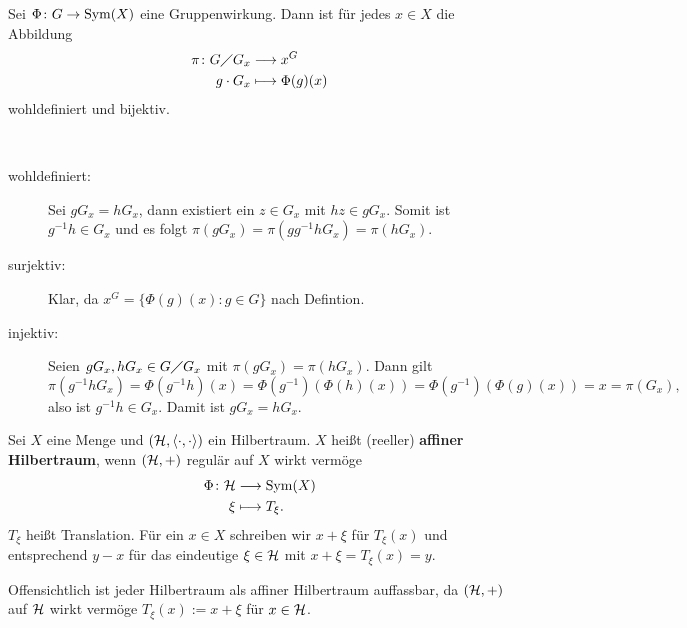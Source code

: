 \begin{lemma}[Bahnensatz]
\label{bahnensatz}
	Sei $\Phi\colon G \rightarrow \operatorname{Sym}(X)$ eine Gruppenwirkung. Dann ist für jedes $x \in X$ die Abbildung
	\begin{equation}
	\begin{aligned}
		\pi\colon G \diagup G_x &\longrightarrow x^G \\
		g\cdot G_x &\longmapsto \Phi(g)(x)
	\end{aligned}
	\end{equation}
	wohldefiniert und bijektiv.
\end{lemma}

\begin{beweis}
	\mbox{} \\[-.85cm]
	\begin{description}
		\item[wohldefiniert:] Sei $gG_x = hG_x$, dann existiert ein $z \in G_x$ mit $hz \in gG_x$. Somit ist $g^{-1}h \in G_x$ und es folgt $\pi(gG_x) = \pi(gg^{-1}hG_x) = \pi(hG_x)$.
		\item[surjektiv:] Klar, da $x^G = \{\Phi(g)(x) : g \in G\}$ nach Defintion.
		\item[injektiv:] Seien $gG_x, hG_x \in G \diagup G_x$ mit $\pi(gG_x) = \pi(hG_x)$. Dann gilt
		\[ \pi(g^{-1}hG_x) = \Phi(g^{-1}h)(x) = \Phi(g^{-1})(\Phi(h)(x)) = \Phi(g^{-1})(\Phi(g)(x)) = x = \pi(G_x), \]
		also ist $g^{-1}h \in G_x$. Damit ist $gG_x = hG_x$. \qedhere
	\end{description}
\end{beweis}

\begin{definition}
	Sei $X$ eine Menge und $(\mathcal{H},\langle\cdot,\cdot\rangle)$ ein Hilbertraum. $X$ heißt (reeller) \textbf{affiner Hilbertraum}, wenn $(\mathcal{H},+)$ regulär auf $X$ wirkt vermöge
	\begin{equation}
	\begin{aligned}
		\Phi\colon \mathcal{H} &\longrightarrow \operatorname{Sym}(X) \\
		\xi &\longmapsto T_\xi.
	\end{aligned}
	\end{equation}
	$T_\xi$ heißt Translation. Für ein $x \in X$ schreiben wir $x + \xi$ für $T_\xi(x)$ und entsprechend $y-x$ für das eindeutige $\xi \in \mathcal{H}$ mit $x + \xi = T_\xi(x) = y$. 
\end{definition}

\begin{bemerkung}
	Offensichtlich ist jeder Hilbertraum als affiner Hilbertraum auffassbar, da $(\mathcal{H},+)$ auf $\mathcal{H}$ wirkt vermöge $T_\xi(x) := x + \xi$ für $x \in \mathcal{H}$.
\end{bemerkung}

